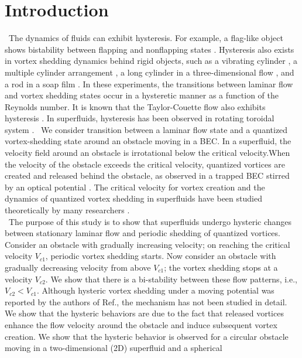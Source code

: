 \documentclass[12pt,a4paper]{jbook}
\begin{document}
\section{Introduction}
\ The dynamics of fluids can exhibit hysteresis. For example,
a flag-like object shows bistability between flapping and
nonflapping states \cite{36}\cite{37}. Hysteresis also exists
in vortex shedding dynamics behind rigid objects, such
as a vibrating cylinder \cite{38}, a multiple cylinder arrangement \cite{39},
a long cylinder in a three-dimensional flow \cite{40},
and a rod in a soap film \cite{41}. In these experiments, the
transitions between laminar flow and vortex shedding states occur
in a hysteretic manner as a function of the Reynolds number.
It is known that the Taylor-Couette flow also exhibits hysteresis \cite{42}.
In superfluids, hysteresis has been observed in rotating toroidal system \cite{43} \cite{44}.
\ We consider transition between a laminar
flow state and a quantized vortex-shedding state around
an obstacle moving in a BEC. In a superfluid,
the velocity field around an obstacle is irrotational
below the critical velocity.When the velocity of the obstacle
exceeds the critical velocity, quantized vortices are
created and released behind the obstacle, as observed in a trapped BEC
stirred by an optical potential \cite{30} \cite{45} \cite{46}. The critical velocity
for vortex creation and the dynamics of quantized vortex
shedding in superfluids have been studied theoretically by many researchers \cite{19}\cite{21}\cite{22}\cite{24}\cite{31}\cite{33}\cite{35}\cite{47}\cite{48}\cite{49}\cite{50}\cite{51}\cite{52}\cite{53}\cite{54}.
\\
\ The purpose of this study is to show that superfluids
undergo hysteric changes between stationary laminar flow
and periodic shedding of quantized vortices. Consider an
obstacle with gradually increasing velocity; on reaching the
critical velocity $V_{c1}$, periodic vortex shedding starts. Now
consider an obstacle with gradually decreasing velocity from
above $V_{c1}$; the vortex shedding stops at a velocity $V_{c2}$. We
show that there is a bi-stability between these flow patterns,
i.e., $V_{c2} < V_{c1}$. Although hysteric vortex shedding under a
moving potential was reported by the authors of Ref.\cite{33},
the mechanism has not been studied in detail.
We show that the hysteric behaviors are due to the
fact that released vortices enhance the flow velocity around
the obstacle and induce subsequent vortex creation. We show
that the hysteric behavior is observed for a circular obstacle
moving in a two-dimensional (2D) superfluid and a spherical
\end{document}
